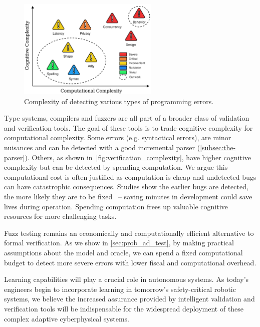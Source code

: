 \begin{figure}
    \centering
    \includegraphics[width=0.60\textwidth]{../figures/verification_complexity.png}
    \caption{Complexity of detecting various types of programming errors.}
    \label{fig:verification_complexity}
\end{figure}

Type systems, compilers and fuzzers are all part of a broader class of validation and verification tools. The goal of these tools is to trade cognitive complexity for computational complexity. Some errors (e.g. syntactical errors), are minor nuisances and can be detected with a good incremental parser (\autoref{subsec:the-parser}). Others, as shown in~\autoref{fig:verification_complexity}, have higher cognitive complexity but can be detected by spending computation. We argue this computational cost is often justified as computation is cheap and undetected bugs can have catastrophic consequences. Studies show the earlier bugs are detected, the more likely they are to be fixed~\citep{distefano2019scaling} -- saving minutes in development could save lives during operation. Spending computation frees up valuable cognitive resources for more challenging tasks.

Fuzz testing remains an economically and computationally efficient alternative to formal verification. As we show in \autoref{sec:prob_ad_test}, by making practical assumptions about the model and oracle, we can spend a fixed computational budget to detect more severe errors with lower fiscal and computational overhead.

Learning capabilities will play a crucial role in autonomous systems. As today's engineers begin to incorporate learning in tomorrow's safety-critical robotic systems, we believe the increased assurance provided by intelligent validation and verification tools will be indispensable for the widespread deployment of these complex adaptive cyberphysical systems.
